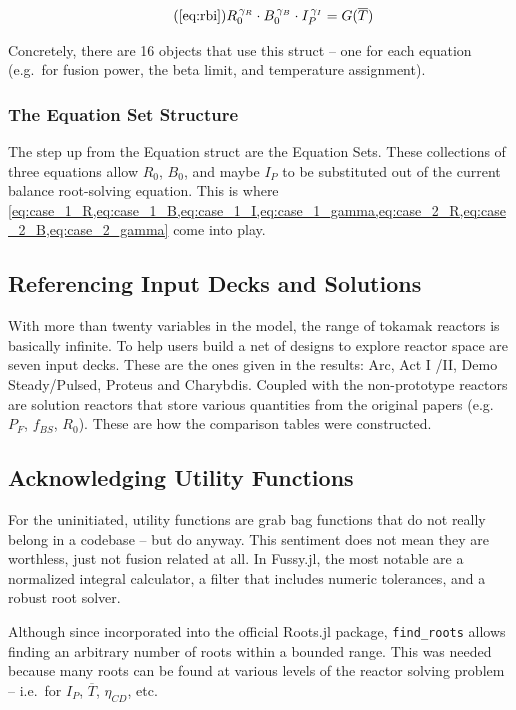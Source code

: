 \begin{equation}
	\tag{\ref{eq:rbi}}
	R_0^{\, \gamma_R} \cdot B_0^{\, \gamma_B} \cdot I_P^{\, \gamma_I} = G( \overline T )
\end{equation}

Concretely, there are 16 objects that use this struct -- one for each equation (e.g.\ for fusion power, the beta limit, and temperature assignment).

\subsubsection{The Equation Set Structure}

The step up from the Equation struct are the Equation Sets. These collections of three equations allow $R_0$, $B_0$, and maybe $I_P$ to be substituted out of the current balance root-solving equation. This is where \cref{eq:case_1_R,eq:case_1_B,eq:case_1_I,eq:case_1_gamma,eq:case_2_R,eq:case_2_B,eq:case_2_gamma} come into play.

\subsection{Referencing Input Decks and Solutions}

With more than twenty  variables in the model, the range of tokamak reactors is basically infinite. To help users build a net of designs to explore reactor space are seven input decks. These are the ones given in the results: Arc, Act I /II, Demo Steady/Pulsed, Proteus and Charybdis. Coupled with the non-prototype reactors are solution reactors that store various quantities from the original papers (e.g.\ $P_F$, $f_{BS}$, $R_0$). These are how the comparison tables were constructed.

\subsection{Acknowledging Utility Functions}

For the uninitiated, utility functions are grab bag functions that do not really belong in a codebase -- but do anyway. This sentiment does not mean they are worthless, just not fusion related at all. In Fussy.jl, the most notable are a normalized integral calculator, a filter that includes numeric tolerances, and a robust root solver. 

Although since incorporated into the official Roots.jl package, \texttt{find\_roots} allows finding an arbitrary number of roots within a bounded range. This was needed because many roots can be found at various levels of the reactor solving problem -- i.e.\ for $I_P$, $\overline T$, $\eta_{CD}$, etc.

